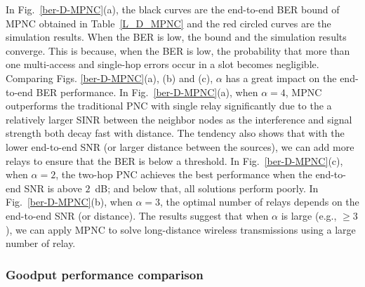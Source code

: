 In Fig.~\ref{ber-D-MPNC}(a), the black curves are the  end-to-end BER bound of MPNC obtained in Table~\ref{L_D_MPNC} and the red circled curves are the simulation results. When the BER is low, the bound and the simulation results converge. This is because,  when the BER is low, the probability that  more than one multi-access and single-hop errors occur in a slot becomes negligible. Comparing Figs. \ref{ber-D-MPNC}(a), (b) and (c),  $\alpha$ has a great impact on the end-to-end BER performance. In Fig.~\ref{ber-D-MPNC}(a), when $\alpha=4$, MPNC outperforms the traditional PNC with single relay significantly due to the a relatively larger SINR between the neighbor nodes as the interference and signal strength both decay fast with distance. The tendency also shows that with the lower end-to-end SNR (or larger distance between the sources), we can add more relays to ensure that the BER is below a threshold.
In Fig.~\ref{ber-D-MPNC}(c), when $\alpha=2$, the two-hop PNC achieves the best performance when the end-to-end SNR is above $2$~dB; and below that, all solutions perform poorly.  
In Fig.~\ref{ber-D-MPNC}(b), when $\alpha=3$, the optimal number of relays depends on the end-to-end SNR (or distance). 
The results suggest that when $\alpha$ is large (e.g., $\ge3$), we can apply MPNC to solve long-distance wireless transmissions using a large number of relay. 

\fi




\subsubsection{Goodput performance comparison} %
\label{sub:throughput}


